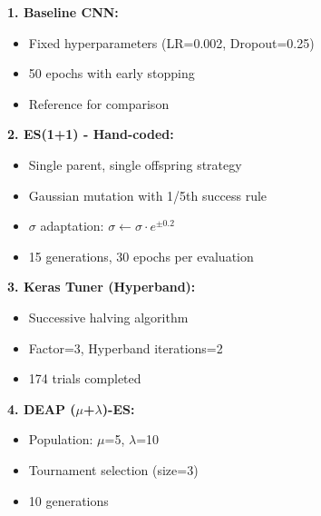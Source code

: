 \documentclass[a0,landscape]{a0poster}
\begin{document}
\begin{minipage}[t]{0.32\linewidth}
\vspace{0.5cm}

\begin{tcolorbox}[boxstyle, title=HPO METHODS COMPARED]
\textbf{1. Baseline CNN:}
\begin{itemize}[leftmargin=*,noitemsep]
    \item Fixed hyperparameters (LR=0.002, Dropout=0.25)
    \item 50 epochs with early stopping
    \item Reference for comparison
\end{itemize}

\textbf{2. ES(1+1) - Hand-coded:}
\begin{itemize}[leftmargin=*,noitemsep]
    \item Single parent, single offspring strategy
    \item Gaussian mutation with 1/5th success rule
    \item $\sigma$ adaptation: $\sigma \leftarrow \sigma \cdot e^{\pm 0.2}$
    \item 15 generations, 30 epochs per evaluation
\end{itemize}

\textbf{3. Keras Tuner (Hyperband):}
\begin{itemize}[leftmargin=*,noitemsep]
    \item Successive halving algorithm
    \item Factor=3, Hyperband iterations=2
    \item 174 trials completed
\end{itemize}

\textbf{4. DEAP ($\mu$+$\lambda$)-ES:}
\begin{itemize}[leftmargin=*,noitemsep]
    \item Population: $\mu$=5, $\lambda$=10
    \item Tournament selection (size=3)
    \item 10 generations
\end{itemize}
\end{tcolorbox}

\end{minipage}
\hfill
\end{document}

